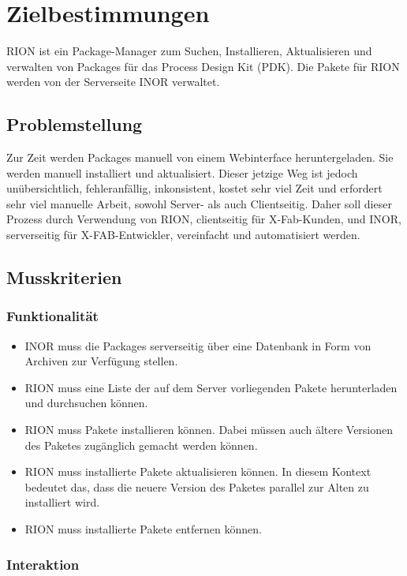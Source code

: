 \chapter{Zielbestimmungen}

RION ist ein Package-Manager zum Suchen, Installieren, Aktualisieren und verwalten von Packages für das Process Design Kit (PDK). Die Pakete für RION werden von der Serverseite INOR verwaltet.

\section{Problemstellung}
Zur Zeit werden Packages manuell von einem Webinterface heruntergeladen. Sie werden manuell installiert und aktualisiert. Dieser jetzige Weg ist jedoch unübersichtlich, fehleranfällig, inkonsistent, kostet sehr viel Zeit und erfordert sehr viel manuelle Arbeit, sowohl Server- als auch Clientseitig. Daher soll dieser Prozess durch Verwendung von RION, clientseitig für X-Fab-Kunden, und INOR, serverseitig für X-FAB-Entwickler, vereinfacht und automatisiert werden.

\section{Musskriterien}
\subsection{Funktionalität}
\begin{itemize}
		\item INOR muss die Packages serverseitig über eine Datenbank in Form von Archiven zur Verfügung stellen.
		\item RION muss eine Liste der auf dem Server vorliegenden Pakete herunterladen und durchsuchen können.
		\item RION muss Pakete installieren können. Dabei müssen auch ältere Versionen des Paketes zugänglich gemacht werden können.
		\item RION muss installierte Pakete aktualisieren können. In diesem Kontext bedeutet das, dass die neuere Version des Paketes parallel zur Alten zu installiert wird.
		\item RION muss installierte Pakete entfernen können.
\end{itemize}

\subsection{Interaktion}


